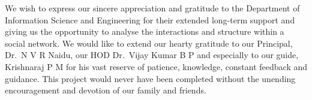 

\begin{acknowledgements}      %


We wish to express our sincere appreciation and gratitude to the Department of Information Science and Engineering for their extended long-term support and giving us the opportunity to analyse the interactions and structure within a social network. We would like to extend our hearty gratitude to our Principal, Dr.~N V R Naidu, our HOD Dr.~Vijay Kumar B P and especially to our guide, Krishnaraj P M for his vast reserve of patience, knowledge, constant feedback and guidance. This project would never have been completed without the unending encouragement and devotion of our family and friends.


\end{acknowledgements}


